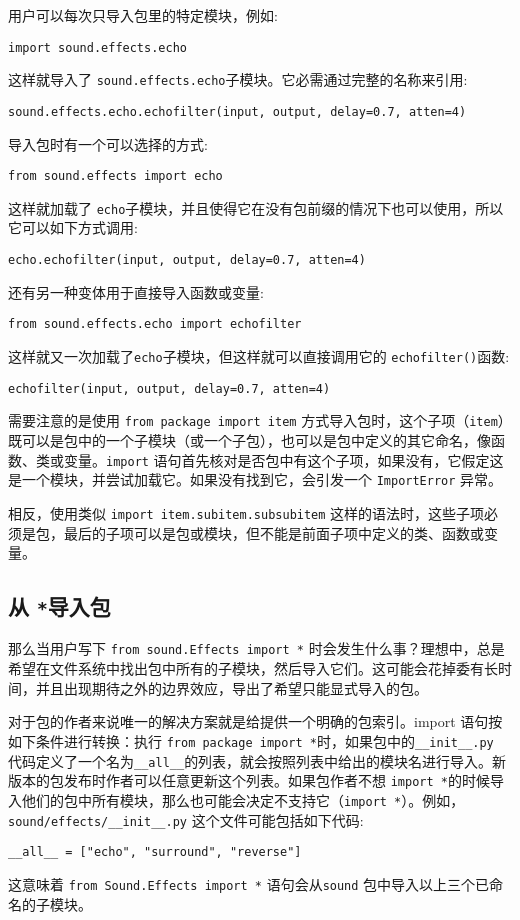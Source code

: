 用户可以每次只导入包里的特定模块，例如:
\begin{lstlisting}
import sound.effects.echo
\end{lstlisting}
这样就导入了 \texttt{sound.effects.echo}子模块。它必需通过完整的名称来引用:
\begin{lstlisting}
sound.effects.echo.echofilter(input, output, delay=0.7, atten=4)
\end{lstlisting}
导入包时有一个可以选择的方式:
\begin{lstlisting}
from sound.effects import echo
\end{lstlisting}
这样就加载了 \texttt{echo}子模块，并且使得它在没有包前缀的情况下也可以使用，所以它可以如下方式调用:
\begin{lstlisting}
echo.echofilter(input, output, delay=0.7, atten=4)
\end{lstlisting}
还有另一种变体用于直接导入函数或变量:
\begin{lstlisting}
from sound.effects.echo import echofilter
\end{lstlisting}
这样就又一次加载了\texttt{echo}子模块，但这样就可以直接调用它的 \texttt{echofilter()}函数:
\begin{lstlisting}
echofilter(input, output, delay=0.7, atten=4)
\end{lstlisting}
需要注意的是使用 \texttt{from package import item} 方式导入包时，这个子项（\texttt{item}）既可以是包中的一个子模块（或一个子包），也可以是包中定义的其它命名，像函数、类或变量。\texttt{import} 语句首先核对是否包中有这个子项，如果没有，它假定这是一个模块，并尝试加载它。如果没有找到它，会引发一个 \texttt{ImportError} 异常。

相反，使用类似 \texttt{import item.subitem.subsubitem} 这样的语法时，这些子项必须是包，最后的子项可以是包或模块，但不能是前面子项中定义的类、函数或变量。
\subsection{从 \texttt{*}导入包}
那么当用户写下 \texttt{from sound.Effects import *} 时会发生什么事？理想中，总是希望在文件系统中找出包中所有的子模块，然后导入它们。这可能会花掉委有长时间，并且出现期待之外的边界效应，导出了希望只能显式导入的包。

对于包的作者来说唯一的解决方案就是给提供一个明确的包索引。import 语句按如下条件进行转换：执行 \texttt{from package import *}时，如果包中的\cprotect\texttt{\verb|__init__|.py} 代码定义了一个名为\verb|__all__|的列表，就会按照列表中给出的模块名进行导入。新版本的包发布时作者可以任意更新这个列表。如果包作者不想 \texttt{import *}的时候导入他们的包中所有模块，那么也可能会决定不支持它（\texttt{import *}）。例如， \cprotect\texttt{sound/effects/\verb|__init__|.py} 这个文件可能包括如下代码:
\begin{lstlisting}
__all__ = ["echo", "surround", "reverse"]
\end{lstlisting}
这意味着 \texttt{from Sound.Effects import *} 语句会从\texttt{sound} 包中导入以上三个已命名的子模块。

